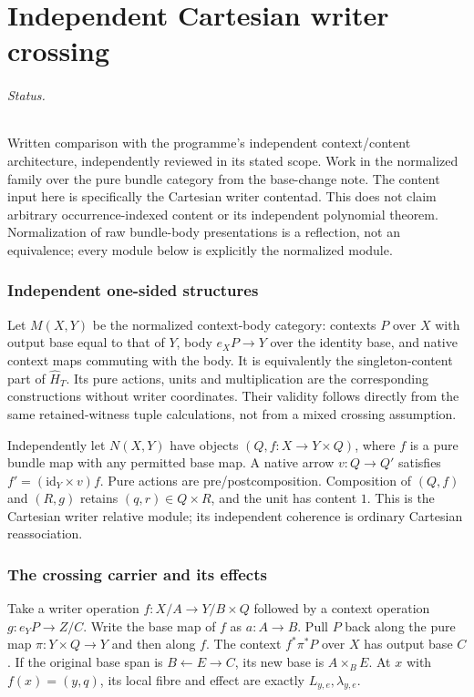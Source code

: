 \documentclass[11pt]{article}
\begin{document}
\part{Independent Cartesian writer crossing}

\paragraph{Status.} Written comparison with the programme's independent context/content architecture, independently reviewed in its stated scope. Work in the normalized family over the pure bundle category from the base-change note. The content input here is specifically the Cartesian writer contentad. This does not claim arbitrary occurrence-indexed content or its independent polynomial theorem. Normalization of raw bundle-body presentations is a reflection, not an equivalence; every module below is explicitly the normalized module.

\section{Independent one-sided structures}
Let $M(X,Y)$ be the normalized context-body category: contexts $P$ over $X$ with output base equal to that of $Y$, body $e_XP\to Y$ over the identity base, and native context maps commuting with the body. It is equivalently the singleton-content part of $\widehat H_T$. Its pure actions, units and multiplication are the corresponding constructions without writer coordinates. Their validity follows directly from the same retained-witness tuple calculations, not from a mixed crossing assumption.

Independently let $N(X,Y)$ have objects $(Q,f:X\to Y\times Q)$, where $f$ is a pure bundle map with any permitted base map. A native arrow $v:Q\to Q'$ satisfies $f'=(\mathrm{id}_Y\times v)f$. Pure actions are pre/postcomposition. Composition of $(Q,f)$ and $(R,g)$ retains $(q,r)\in Q\times R$, and the unit has content $1$. This is the Cartesian writer relative module; its independent coherence is ordinary Cartesian reassociation.

\section{The crossing carrier and its effects}
Take a writer operation $f:X/A\to Y/B\times Q$ followed by a context operation $g:e_YP\to Z/C$. Write the base map of $f$ as $a:A\to B$. Pull $P$ back along the pure map $\pi:Y\times Q\to Y$ and then along $f$. The context $f^*\pi^*P$ over $X$ has output base $C$. If the original base span is $B\leftarrow E\to C$, its new base is $A\times_B E$. At $x$ with $f(x)=(y,q)$, its local fibre and effect are exactly $L_{y,e},\lambda_{y,e}$.
\end{document}
